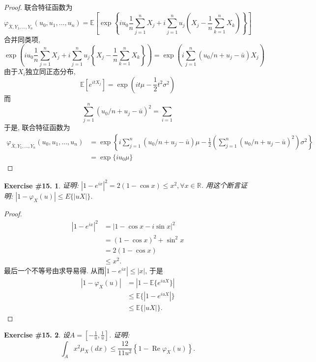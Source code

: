 \documentclass[UTF8, a4paper]{article}
\newtheorem{exercise}{Exercise \#15.}
\begin{document}
\begin{proof}
联合特征函数为
$$
\varphi_{\bar{X}, Y_1, \ldots, Y_n}\left(u_0, u_1, \ldots, u_n\right)=\mathbb{E}\left[\exp \left\{i u_0 \frac{1}{n} \sum_{j=1}^n X_j+i \sum_{j=1}^n u_j\left(X_j-\frac{1}{n} \sum_{k=1}^n X_k\right)\right\}\right]
$$
合并同类项, 
$$
\exp \left(i u_0 \frac{1}{n} \sum_{j=1}^n X_j+i \sum_{j=1}^n u_j\left\{X_j-\frac{1}{n} \sum_{k=1}^n X_k\right\}\right)=\exp \left(i \sum_{j=1}^n\left(u_0/n+u_j - \bar{u}\right) X_j\right)
$$
由于\(X_i\)独立同正态分布, 
$$
\mathbb{E}\left[e^{i t X_j}\right]=\exp \left(i t \mu-\frac{1}{2} t^2 \sigma^2\right)
$$
而
$$
\sum_{j=1}^n\left(u_0/n+u_j - \bar{u}\right)^2 = \sum_{i = 1}^{}
$$
于是, 联合特征函数为
$$
\begin{aligned}
    \varphi_{\bar{X}, Y_1, \ldots, Y_n}\left(u_0, u_1, \ldots, u_n\right)&=\exp \left\{i\sum_{j=1}^n\left(u_0/n+u_j - \bar{u}\right) \mu-\frac{1}{2}\left(\sum_{j=1}^n\left(u_0/n+u_j - \bar{u}\right)^2\right) \sigma^2\right\} \\
    &= \exp\{iu_0 \mu\} 
\end{aligned}
$$

\end{proof}


\begin{framed}
\begin{exercise}
证明: \(\left|1-e^{i x}\right|^2=2(1-\cos x) \leq x^2, \forall x \in \mathbb{R}\).
用这个断言证明: $\left|1-\varphi_X(u)\right| \leq E\{|u X|\}$.
\end{exercise}
\end{framed}

\begin{proof}
\begin{align*}
    \left|1-e^{i x}\right|^2 &= \left|1-\cos x - i\sin x\right|^2 \\
    &= (1-\cos x)^2 + \sin^2 x \\
    &= 2(1-\cos x) \\
    &\leq x^2.
\end{align*}
最后一个不等号由求导易得.
从而\(|1-e^{i x}| \leq |x|\), 于是
\begin{align*}
    \left|1-\varphi_X(u)\right| &= 
    \left|1-\mathbb{E}\{e^{i u X}\}\right| \\
    &\leq \mathbb{E}\{\left|1-e^{i u X}\right| \}\\
    &\leq \mathbb{E}\{|u X|\}.
\end{align*}
\end{proof}


\begin{framed}
\begin{exercise}
设\(A = \left[-\frac{1}{u}, \frac{1}{u}\right]\). 证明:
$$
\int_A x^2 \mu_X(d x) \leq \frac{12}{11 u^2}\left\{1-\operatorname{Re} \varphi_X(u)\right\} .
$$
\end{exercise} 
\end{framed}
\end{document}
